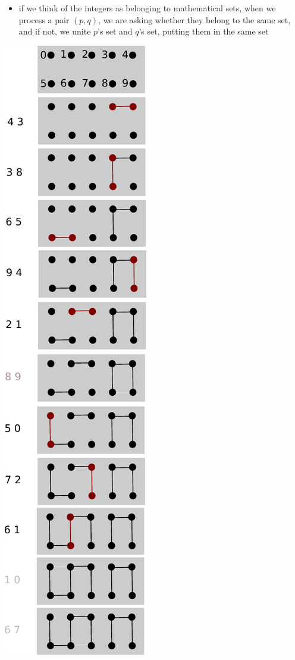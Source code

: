 \documentclass[8pt,a4paper,compress]{beamer}
\begin{document}
\begin{frame}[fragile]
\begin{minipage}{250pt}
\begin{itemize}
\begin{itemize}
\item if we think of the integers as belonging to mathematical sets, when we process a pair $(p, q)$, we are asking whether they belong to the same set, and if not, we unite $p$'s set and $q$'s set, putting them in the same set
\end{itemize}
\end{itemize}
\end{minipage}%
\begin{minipage}{60pt}
\hfill \includegraphics[scale=0.35]{./figures/dyn_conn.pdf}
\end{minipage}
\end{frame}
\end{document}
